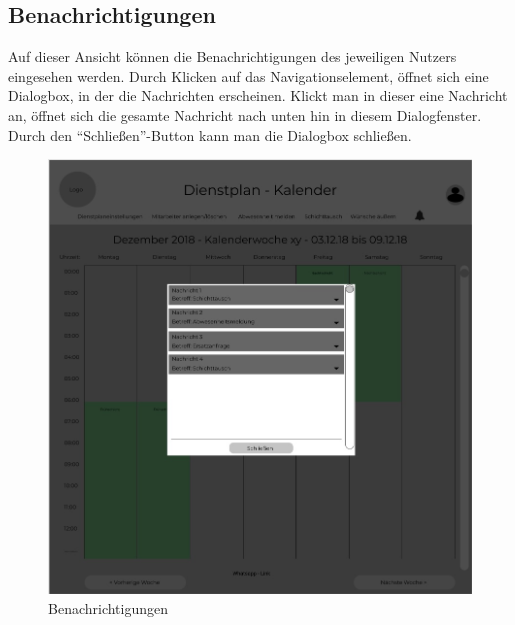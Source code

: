 \documentclass[11pt,
paper=a4,
bibtotocnumbered,	  %
liststotocnumbered,  %
DIV=calc,		  %
tablecaptionabove,	  %
headinclude,
]{article}
\begin{document}
\subsection{Benachrichtigungen}
Auf dieser Ansicht können die Benachrichtigungen des jeweiligen Nutzers eingesehen werden. Durch Klicken auf das Navigationselement, öffnet sich eine Dialogbox, in der die Nachrichten erscheinen. Klickt man in dieser eine Nachricht an, öffnet sich die gesamte Nachricht nach unten hin in diesem Dialogfenster. Durch den “Schließen”-Button kann man die Dialogbox schließen.
\begin{figure}[H]
\includegraphics[scale=1]{Bilder/Benachrichtigungen-Mockup.jpg}
\caption{Benachrichtigungen}
\end{figure}
\end{document}
